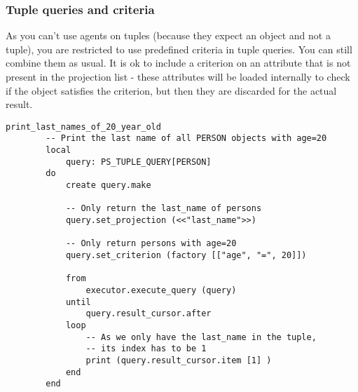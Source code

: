 \subsubsection{Tuple queries and criteria}
As you can't use agents on tuples (because they expect an object and not a tuple), you are restricted to use predefined criteria in tuple queries. You can still combine them as usual.
It is ok to include a criterion on an attribute that is not present in the projection list - these attributes will be loaded internally to check if the object satisfies the criterion, but then they are discarded for the actual result.

\begin{lstlisting}[language=OOSC2Eiffel, captionpos=b, caption={}, label={lst:tuple_projection_selection}]
	print_last_names_of_20_year_old
		-- Print the last name of all PERSON objects with age=20
		local
			query: PS_TUPLE_QUERY[PERSON]
		do
			create query.make

			-- Only return the last_name of persons
			query.set_projection (<<"last_name">>)

			-- Only return persons with age=20
			query.set_criterion (factory [["age", "=", 20]])

			from
				executor.execute_query (query)
			until
				query.result_cursor.after
			loop
				-- As we only have the last_name in the tuple,
				-- its index has to be 1
				print (query.result_cursor.item [1] )
			end			
		end
\end{lstlisting}

